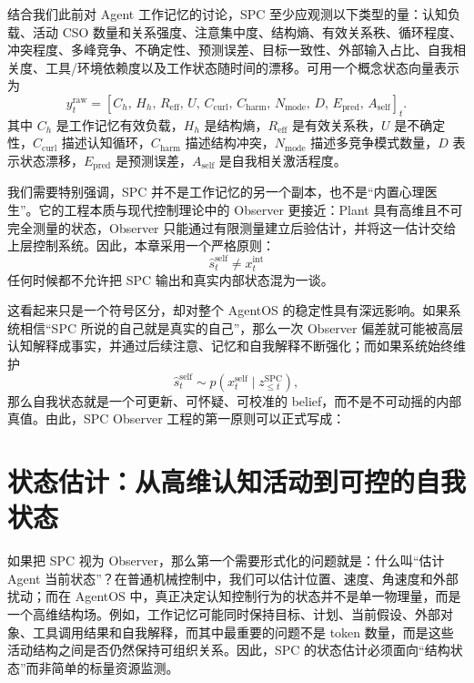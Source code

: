 结合我们此前对 Agent 工作记忆的讨论，SPC 至少应观测以下类型的量：认知负载、活动 CSO 数量和关系强度、注意集中度、结构熵、有效关系秩、循环程度、冲突程度、多峰竞争、不确定性、预测误差、目标一致性、外部输入占比、自我相关度、工具/环境依赖度以及工作状态随时间的漂移。可用一个概念状态向量表示为
\begin{equation}
y_t^{\mathrm{raw}}
=
\left[
C_h,\,
H_h,\,
R_{\mathrm{eff}},\,
U,\,
C_{\mathrm{curl}},\,
C_{\mathrm{harm}},\,
N_{\mathrm{mode}},\,
D,\,
E_{\mathrm{pred}},\,
A_{\mathrm{self}}
\right]_t.
\end{equation}
其中 $C_h$ 是工作记忆有效负载，$H_h$ 是结构熵，$R_{\mathrm{eff}}$ 是有效关系秩，$U$ 是不确定性，$C_{\mathrm{curl}}$ 描述认知循环，$C_{\mathrm{harm}}$ 描述结构冲突，$N_{\mathrm{mode}}$ 描述多竞争模式数量，$D$ 表示状态漂移，$E_{\mathrm{pred}}$ 是预测误差，$A_{\mathrm{self}}$ 是自我相关激活程度。

我们需要特别强调，SPC 并不是工作记忆的另一个副本，也不是“内置心理医生”。它的工程本质与现代控制理论中的 Observer 更接近：Plant 具有高维且不可完全测量的状态，Observer 只能通过有限测量建立后验估计，并将这一估计交给上层控制系统。因此，本章采用一个严格原则：
\begin{equation}
\boxed{
\hat s_t^{\mathrm{self}}
\neq
x_t^{\mathrm{int}}
}
\end{equation}
任何时候都不允许把 SPC 输出和真实内部状态混为一谈。

这看起来只是一个符号区分，却对整个 AgentOS 的稳定性具有深远影响。如果系统相信“SPC 所说的自己就是真实的自己”，那么一次 Observer 偏差就可能被高层认知解释成事实，并通过后续注意、记忆和自我解释不断强化；而如果系统始终维护
\begin{equation}
\hat s_t^{\mathrm{self}}
\sim
p
\left(
x_t^{\mathrm{self}}
\mid
z_{\leq t}^{\mathrm{SPC}}
\right),
\end{equation}
那么自我状态就是一个可更新、可怀疑、可校准的 belief，而不是不可动摇的内部真值。由此，SPC Observer 工程的第一原则可以正式写成：
\begin{statementbox}
\centering
{}
\end{statementbox}

\section{状态估计：从高维认知活动到可控的自我状态}
\label{sec:spc-state-estimation}

如果把 SPC 视为 Observer，那么第一个需要形式化的问题就是：什么叫“估计 Agent 当前状态”？在普通机械控制中，我们可以估计位置、速度、角速度和外部扰动；而在 AgentOS 中，真正决定认知控制行为的状态并不是单一物理量，而是一个高维结构场。例如，工作记忆可能同时保持目标、计划、当前假设、外部对象、工具调用结果和自我解释，而其中最重要的问题不是 token 数量，而是这些活动结构之间是否仍然保持可组织关系。因此，SPC 的状态估计必须面向“结构状态”而非简单的标量资源监测。

